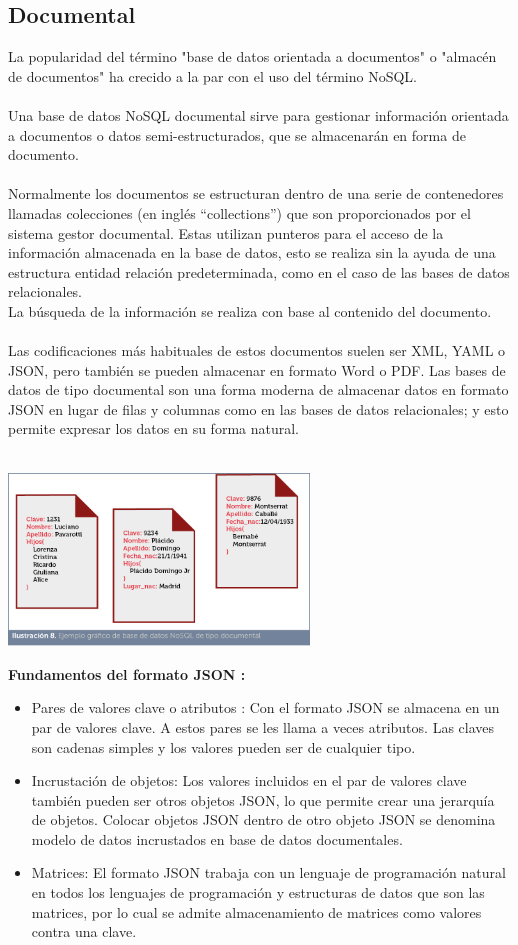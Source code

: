 \documentclass[%
 reprint,
 amsmath,amssymb,
 aps,
]{revtex4-1}
\begin{document}
\subsection{Documental}
 La popularidad del término "base de datos orientada a documentos" o "almacén de documentos" ha crecido a la par con el uso del término NoSQL.\\
\\ Una base de datos NoSQL documental sirve para gestionar información orientada a documentos o datos semi-estructurados, que se almacenarán en forma de documento.
\\\\Normalmente los documentos se estructuran dentro de una serie de contenedores llamadas colecciones (en inglés “collections”) que son proporcionados por el sistema gestor documental. Estas utilizan punteros para el acceso de la información almacenada en la base de datos, esto se realiza sin la ayuda de una estructura entidad relación predeterminada, como en el caso de las bases de datos relacionales.\\
La búsqueda de la información se realiza con base al contenido del documento. \\\\
Las codificaciones más habituales de estos documentos suelen ser XML, YAML o JSON, pero también se pueden almacenar en formato Word o PDF. Las bases de datos de tipo documental son una forma moderna de almacenar datos en formato JSON en lugar de filas y columnas como en las bases de datos relacionales; y esto permite expresar los datos en su forma natural. \\\\
\begin{center}
	\includegraphics[width=8cm]{./Imagenes/documental1}
\end{center}	
\textbf{Fundamentos del formato JSON :}
\begin{itemize}
		\item Pares de valores clave o atributos :  Con el formato JSON se almacena en un par de valores clave. A estos pares se les llama a veces atributos. Las claves son cadenas simples y los valores pueden ser de cualquier tipo.
		\item Incrustación de objetos: Los valores incluidos en el par de valores clave también pueden ser otros objetos JSON, lo que permite crear una jerarquía de objetos. Colocar objetos JSON dentro de otro objeto JSON se denomina modelo de datos incrustados en base de datos documentales.
		\item Matrices: El formato JSON trabaja con un lenguaje de programación natural en todos los lenguajes de programación y estructuras de datos que son las matrices, por lo cual se admite almacenamiento de matrices como valores contra una clave.
\end{itemize}
\end{document}
